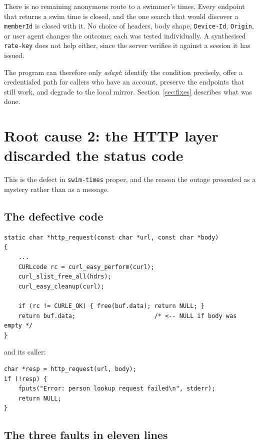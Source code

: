 \documentclass[11pt]{article}
\newcommand{\code}[1]{\texttt{#1}}
\begin{document}
There is no remaining anonymous route to a swimmer's times.  Every
endpoint that returns a swim time is closed, and the one search that
would discover a \code{memberId} is closed with it.  No choice of
headers, body shape, \code{Device-Id}, \code{Origin}, or user agent
changes the outcome; each was tested individually.  A synthesised
\code{rate-key} does not help either, since the server verifies it
against a session it has issued.

The program can therefore only \emph{adapt}: identify the condition
precisely, offer a credentialed path for callers who have an account,
preserve the endpoints that still work, and degrade to the local
mirror.  Section~\ref{sec:fixes} describes what was done.

\section{Root cause 2: the HTTP layer discarded the status code}

This is the defect in \code{swim-times} proper, and the reason the
outage presented as a mystery rather than as a message.

\subsection{The defective code}

\begin{lstlisting}
static char *http_request(const char *url, const char *body)
{
    ...
    CURLcode rc = curl_easy_perform(curl);
    curl_slist_free_all(hdrs);
    curl_easy_cleanup(curl);

    if (rc != CURLE_OK) { free(buf.data); return NULL; }
    return buf.data;                      /* <-- NULL if body was empty */
}
\end{lstlisting}

\noindent and its caller:

\begin{lstlisting}
char *resp = http_request(url, body);
if (!resp) {
    fputs("Error: person lookup request failed\n", stderr);
    return NULL;
}
\end{lstlisting}

\subsection{The three faults in eleven lines}
\end{document}
